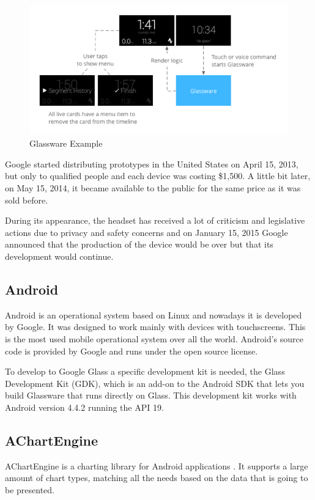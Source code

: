 \documentclass[a4paper,11pt]{article}
\begin{document}
\begin{figure}[H]
\centering
\includegraphics[width = 0.6\linewidth]{images/glass_cards_example.png}
\caption{Glassware Example}
\label{cardexample}
\end{figure}

Google started distributing prototypes \cite{googleglassstyle} in the United States on April 15, 2013, but only to qualified people and each device was costing \$1,500. A little bit later, on May 15, 2014, it became available to the public for the same price as it was sold before.

During its appearance, the headset has received a lot of criticism and legislative actions \cite{glassprivacy} due to privacy and safety concerns and on January 15, 2015 Google announced that the production of the device would be over but that its development would continue.

\subsection{Android}

Android is an operational system \cite{androiddevelopers} based on Linux and nowadays it is developed by Google. It was designed to work mainly with devices with touchscreens. This is the most used mobile operational system over all the world. Android’s source code is provided by Google and runs under the open source license.

To develop to Google Glass a specific development kit is needed, the Glass Development Kit (GDK), which is an add-on to the Android SDK that lets you build Glassware that runs directly on Glass. This development kit works with Android version 4.4.2 running the API 19.

\subsection{AChartEngine}

AChartEngine is a charting library for Android applications \cite{acharengine}. It supports a large amount of chart types, matching all the needs based on the data that is going to be presented.
\end{document}
